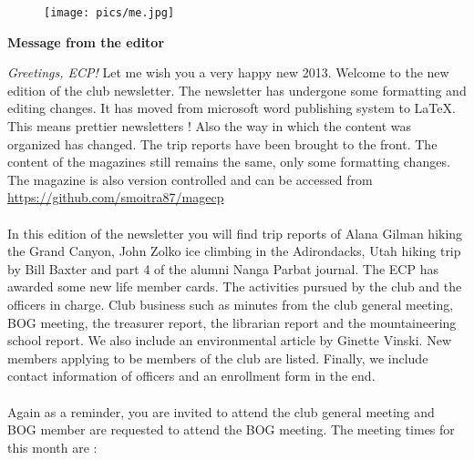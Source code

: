\documentclass[10pt,a4paper]{article}
\newcommand{\NewsItem}[1]{%
		\usefont{T1}{augie}{m}{n} 	
		\large \bf #1 \vspace{4pt}
		\par \normalsize \normalfont}
\begin{document}
\begin{center}
\begin{minipage}[h]{0.8\linewidth}
	\begin{figure}
		\texttt{[image: pics/me.jpg]}
		\\%
	\end{figure}
	
	\NewsItem{Message from the editor}
	\emph{Greetings, ECP!} Let me wish you a very happy new 2013. Welcome to the new edition of the club newsletter. The newsletter has undergone some formatting and editing changes. It has moved from microsoft word publishing system to \LaTeX. This means prettier newsletters ! Also the way in which the content was organized has changed. The trip reports have been brought to the front. The content of the magazines still remains the same, only some formatting changes. The magazine is also version controlled and can be accessed from \url{https://github.com/smoitra87/magecp} 	
\\
\\
	In this edition of the newsletter you will find trip reports of Alana Gilman hiking the Grand Canyon, John Zolko ice climbing in the Adirondacks, Utah hiking trip by Bill Baxter and part 4 of the alumni Nanga Parbat journal. The ECP has awarded some new life member cards. The activities pursued by the club and the officers in charge. Club business such as minutes from the club general meeting, BOG meeting, the treasurer report, the librarian report and the mountaineering school report. We also include an environmental article by Ginette Vinski. New members applying to be members of the club are listed. Finally, we include contact information of officers and an enrollment form in the end. 
\\
\\
	Again as a reminder, you are invited to attend the club general meeting and BOG member are requested to attend the BOG meeting. The meeting times for this month are :
	
\end{minipage}
\end{center}



\pagebreak
\clearpage
\end{document}
